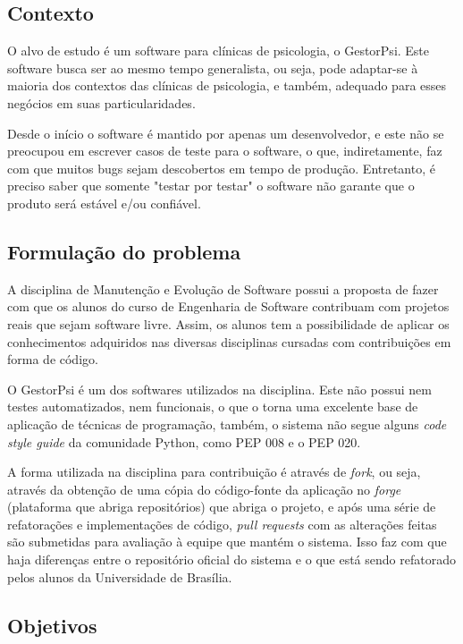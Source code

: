 
\subsection{Contexto} %
\label{sub:contexto}
O alvo de estudo é um software para clínicas de psicologia, o GestorPsi.
Este software busca ser ao mesmo tempo generalista, ou seja,
pode adaptar-se à maioria dos contextos das clínicas de psicologia, e também,
adequado para esses negócios em suas particularidades.

Desde o início o software é mantido por apenas um desenvolvedor,
e este não se preocupou em escrever casos de teste para o software, o que,
indiretamente, faz com que muitos bugs sejam descobertos em tempo de produção.
Entretanto, é preciso saber que somente "testar por testar" o software não garante
que o produto será estável e/ou confiável.
\subsection{Formulação do problema} %
\label{sub:formula_o_do_problema}

A disciplina de Manutenção e Evolução de Software possui a proposta de fazer com
que os alunos do curso de Engenharia de Software contribuam com projetos reais
que sejam software livre.
Assim, os alunos tem a possibilidade de aplicar os conhecimentos adquiridos nas
diversas disciplinas cursadas com contribuições em forma de código.

O GestorPsi é um dos softwares utilizados na disciplina. Este não possui nem testes
automatizados, nem funcionais, o que o torna uma excelente base de aplicação de
técnicas de programação, também, o sistema não segue alguns \textit{code style guide}
da comunidade Python, como PEP 008 e o PEP 020.

A forma utilizada na disciplina para contribuição é através de \textit{fork}, ou seja,
através da obtenção de uma cópia do código-fonte da aplicação no \textit{forge}
(plataforma que abriga repositórios) que abriga o projeto, e após uma série de
refatorações e implementações de código, \textit{pull requests} com as alterações
feitas são submetidas para avaliação à equipe que mantém o sistema. Isso faz com
que haja diferenças entre o repositório oficial do sistema e o que está sendo
refatorado pelos alunos da Universidade de Brasília.

\subsection{Objetivos} %
\label{sub:objetivos}

